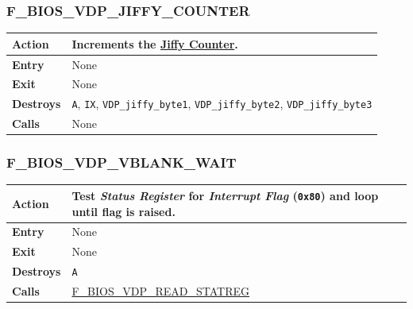\documentclass[a4paper,11pt]{article}
\begin{document}
        \subsubsection{F\_BIOS\_VDP\_JIFFY\_COUNTER}
        \label{func:fbiosvdpjiffycounter}
        \begin{tabular}{l p{9cm}}
            \hline\textbf{Action}
            & Increments the \hyperref[subsec:jiffy_counter]{Jiffy Counter}.\\
            \hline\textbf{Entry} & None\\
            \hline\textbf{Exit} & None\\
            \hline\textbf{Destroys} & \texttt{A}, \texttt{IX},
            \texttt{VDP\_jiffy\_byte1}, \texttt{VDP\_jiffy\_byte2},
            \texttt{VDP\_jiffy\_byte3}\\
            \hline\textbf{Calls} & None\\
            \hline
        \end{tabular}

        \subsubsection{F\_BIOS\_VDP\_VBLANK\_WAIT}
        \label{func:fbiosvdpvblankwait}
        \begin{tabular}{l p{9cm}}
            \hline\textbf{Action}
            & Test \textit{Status Register} for \textit{Interrupt Flag}
            (\texttt{0x80}) and loop until flag is raised.\\
            \hline\textbf{Entry} & None\\
            \hline\textbf{Exit} & None\\
            \hline\textbf{Destroys} & \texttt{A}\\
            \hline\textbf{Calls} & 
            \hyperref[func:fbiosvdpreadstatreg]{F\_BIOS\_VDP\_READ\_STATREG}\\
            \hline
        \end{tabular}

\end{document}
